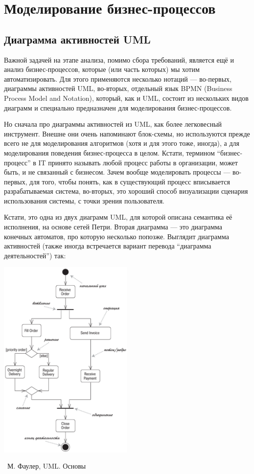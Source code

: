 \documentclass[a5paper]{article}
\newcommand{\attribution}[1] {
    \vspace{-4mm}\begin{flushright}\begin{scriptsize}%
    {\textcopyright\, #1}\end{scriptsize}\end{flushright}
}
\begin{document}
\section{Моделирование бизнес-процессов}

\subsection{Диаграмма активностей UML}

Важной задачей на этапе анализа, помимо сбора требований, является ещё и анализ бизнес-процессов, которые (или часть которых) мы хотим автоматизировать. Для этого применяются несколько нотаций --- во-первых, диаграммы активностей UML, во-вторых, отдельный язык BPMN (Business Process Model and Notation), который, как и UML, состоит из нескольких видов диаграмм и специально предназначен для моделирования бизнес-процессов.

Но сначала про диаграммы активностей из UML, как более легковесный инструмент. Внешне они очень напоминают блок-схемы, но используются прежде всего не для моделирования алгоритмов (хотя и для этого тоже, иногда), а для моделирования поведения бизнес-процесса в целом. Кстати, термином ``бизнес-процесс'' в IT принято называть любой процесс работы в организации, может быть, и не связанный с бизнесом. Зачем вообще моделировать процессы --- во-первых, для того, чтобы понять, как в существующий процесс вписывается разрабатываемая система, во-вторых, это хороший способ визуализации сценария использования системы, с точки зрения пользователя.

Кстати, это одна из двух диаграмм UML, для которой описана семантика её исполнения, на основе сетей Петри. Вторая диаграмма --- это диаграмма конечных автоматов, про которую несколько попозже. Выглядит диаграмма активностей (также иногда встречается вариант перевода ``диаграмма деятельностей'') так:

\begin{center}
    \includegraphics[width=0.5\textwidth]{activityDiagram.png}
    \attribution{М. Фаулер, UML. Основы}
\end{center}
\end{document}
